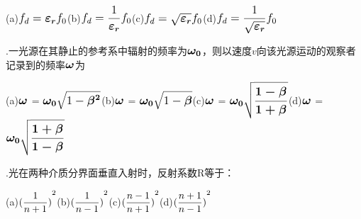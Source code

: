 \vspace{0.4cm}
(a)\hspace{0.6em}$\large{{f_d} = \boldsymbol{\varepsilon_r} {f_0}}$\hspace{1.6em}(b)\hspace{0.6em}$\large{{f_d} = \displaystyle{\frac{1}{\boldsymbol{\varepsilon_r}}} {f_0}}$\hspace{1.6em}(c)\hspace{0.6em}$\large{{f_d} = \sqrt{\boldsymbol{\varepsilon_r}} {f_0}}$\hspace{1.6em}(d)\hspace{0.6em}$\large{{f_d} = \displaystyle{\frac{1}{\sqrt{\boldsymbol{\varepsilon_r}}}} {f_0}}$
\vspace{0.4cm}

.\hspace{0.8em}一光源在其静止的参考系中辐射的频率为$\large{\boldsymbol{\omega_0}}$，则以速度$v$向该光源运动的观察者记录到的频率$\large{\boldsymbol{\omega}}$为

\vspace{0.4cm}
(a)\hspace{0.6em}$\large{\boldsymbol{\omega}}$ = $\large{\boldsymbol{\omega_0}} \sqrt{1- \large{\boldsymbol{\beta^2}}}$\hspace{1.0em}(b)\hspace{0.6em}$\large{\boldsymbol{\omega}} $ = $\displaystyle{\large{\boldsymbol{\omega_0}} \sqrt{1- \large{\boldsymbol{\beta}}}}$\hspace{1.0em}(c)\hspace{0.6em}$\large{\boldsymbol{\omega}}$ = $\displaystyle{\large{\boldsymbol{\omega_0}} \sqrt{ \large{\boldsymbol{\frac{1-\beta}{1+\beta}}}}}$\hspace{1.0em}(d)\hspace{0.6em}$\large{\boldsymbol{\omega}}$ = $\displaystyle{\large{\boldsymbol{\omega_0}} \sqrt{ \large{\boldsymbol{\frac{1+\beta}{1-\beta}}}}}$
\vspace{0.4cm}

.\hspace{0.8em}光在两种介质分界面垂直入射时，反射系数R等于：

\vspace{0.4cm}
(a)\hspace{0.6em}$\displaystyle{\large{  {(\frac{1}{n+1})}^2 }}$\hspace{1.6em}(b)\hspace{0.6em}$\displaystyle{\large{  {(\frac{1}{n-1})}^2 }}$\hspace{1.6em}(c)\hspace{0.6em}$\displaystyle{\large{  {(\frac{n-1}{n+1})}^2 }}$\hspace{1.6em}(d)\hspace{0.6em}$\displaystyle{\large{  {(\frac{n+1}{n-1})}^2 }}$
\vspace{0.4cm}

